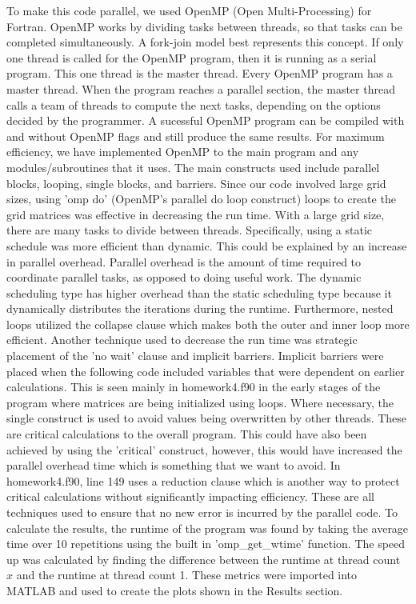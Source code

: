 \documentclass[12pt]{article}
\begin{document}
	To make this code parallel, we used OpenMP (Open Multi-Processing) for Fortran. OpenMP works by dividing tasks between threads, so that tasks can be completed simultaneously. A fork-join model best represents this concept. If only one thread is called for the OpenMP program, then it is running as a serial program. This one thread is the master thread. Every OpenMP program has a master thread. When the program reaches a parallel section, the master thread calls a team of threads to compute the next tasks, depending on the options decided by the programmer. A sucessful OpenMP program can be compiled with and without OpenMP flags and still produce the same results. For maximum efficiency, we have implemented OpenMP to the main program and any modules/subroutines that it uses. 
\newline \newline
The main constructs used include parallel blocks, looping, single blocks, and barriers. Since our code involved large grid sizes, using 'omp do' (OpenMP's parallel do loop construct) loops to create the grid matrices was effective in decreasing the run time. With a large grid size, there are many tasks to divide between threads. Specifically, using a static schedule was more efficient than dynamic. This could be explained by an increase in parallel overhead. Parallel overhead is the amount of time required to coordinate parallel tasks, as opposed to doing useful work. The dynamic scheduling type has higher overhead than the static scheduling type because it dynamically distributes the iterations during the runtime. Furthermore, nested loops utilized the collapse clause which makes both the outer and inner loop more efficient.  
	\newline \newline
	Another technique used to decrease the run time was strategic placement of the 'no wait' clause and implicit barriers. Implicit barriers were placed when the following code included variables that were dependent on earlier calculations. This is seen mainly in homework4.f90 in the early stages of the program where matrices are being initialized using loops. Where necessary, the single construct is used to avoid values being overwritten by other threads. These are critical calculations to the overall program. This could have also been achieved by using the 'critical' construct, however, this would have increased the parallel overhead time which is something that we want to avoid. In homework4.f90, line 149 uses a reduction clause which is another way to protect critical calculations without significantly impacting efficiency. These are all techniques used to ensure that no new error is incurred by the parallel code.   
\newline \newline
	To calculate the results, the runtime of the program was found by taking the average time over 10 repetitions using the built in 'omp\_get\_wtime' function. The speed up was calculated by finding the difference between the runtime at thread count $x$ and the runtime at thread count 1. These metrics were imported into MATLAB and used to create the plots shown in the Results section.
\end{document}

